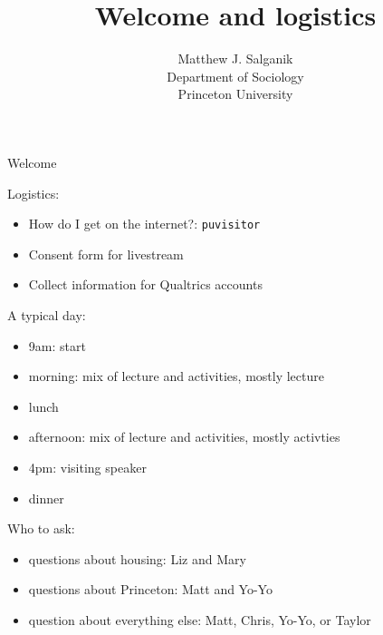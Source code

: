 \documentclass{beamer}
\title[]{Welcome and logistics}
\author[]{Matthew J. Salganik\\Department of Sociology\\Princeton University}
\date[]{Summer Institute in Computational Social Science\\June 19, 2017
\vfill
\begin{flushright}
\vspace{0.6in}
\texttt{[image: figures/cc-by.png]}
\end{flushright}
}
\begin{document}
\frame{\titlepage}
\begin{frame}

\begin{center}
\Large{Welcome}
\end{center}

\end{frame}
\begin{frame}

Logistics:
\pause
\begin{itemize}
\item How do I get on the internet?: \texttt{puvisitor}
\pause
\item Consent form for livestream
\pause
\item Collect information for Qualtrics accounts
\end{itemize}

\end{frame}
\begin{frame}

A typical day:
\begin{itemize}
\item 9am: start
\item morning: mix of lecture and activities, mostly lecture
\item lunch
\item afternoon: mix of lecture and activities, mostly activties
\item 4pm: visiting speaker
\item dinner
\end{itemize}

\end{frame}
\begin{frame}

Who to ask:
\begin{itemize}
\item questions about housing: Liz and Mary
\item questions about Princeton: Matt and Yo-Yo
\item question about everything else: Matt, Chris, Yo-Yo, or Taylor
\end{itemize}

\end{frame}
\end{document}
